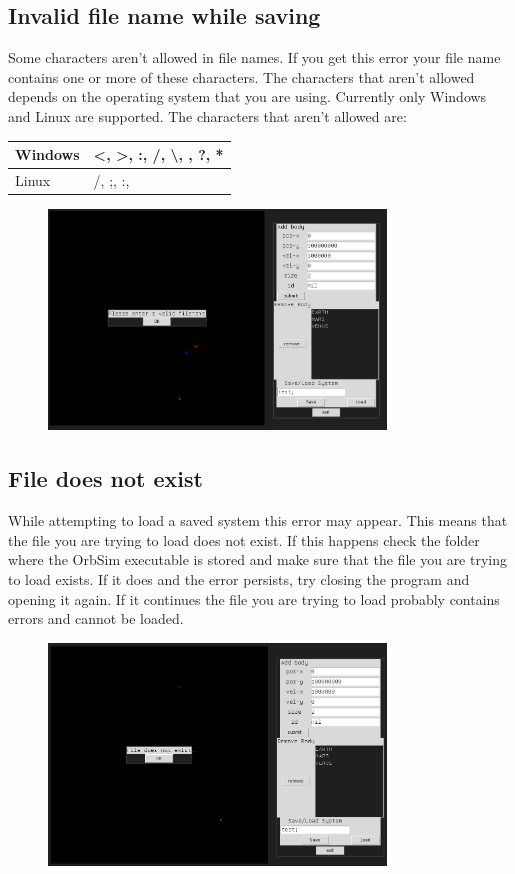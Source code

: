 \documentclass[a4paper,11pt,titlepage]{article}
\begin{document}
\subsection{Invalid file name while saving}
Some characters aren't allowed in file names. If you get this error your file
name contains one or more of these characters. The characters that aren't
allowed depends on the operating system that you are using. Currently only
Windows and Linux are supported. The characters that aren't allowed are: \\

\begin{tabular}{l|l}
	Windows & \textless, \textgreater, :, /, \textbackslash{}, \textbar, ?,
	* \\ \hline
	Linux & /, ;, :, \textbar
\end{tabular}
\begin{figure}[H]
	\centering
	\includegraphics[width=0.8\textwidth]{../img/save.png}
\end{figure}

\subsection{File does not exist}
While attempting to load a saved system this error may appear. This means that
the file you are trying to load does not exist. If this happens check the folder
where the OrbSim executable is stored and make sure that the file you are trying
to load exists. If it does and the error persists, try closing the program and
opening it again. If it continues the file you are trying to load probably
contains errors and cannot be loaded.
\begin{figure}[H]
	\centering
	\includegraphics[width=0.8\textwidth]{../img/load.png}
\end{figure}
\end{document}
